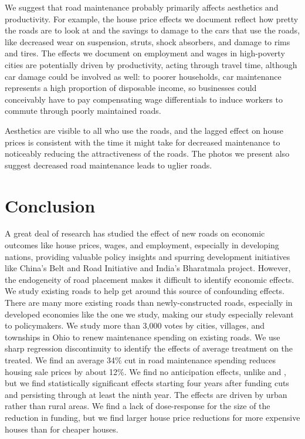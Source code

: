 We suggest that road maintenance probably primarily affects aesthetics and productivity.  For example, the house price effects we document reflect how pretty the roads are to look at and the savings to damage to the cars that use the roads, like decreased wear on suspension, struts, shock absorbers, and damage to rims and tires. The effects we document on employment and wages in high-poverty cities are potentially driven by productivity, acting through travel time, although car damage could be involved as well:  to poorer households, car maintenance represents a high proportion of disposable income, so businesses could conceivably have to pay compensating wage differentials to induce workers to commute through poorly maintained roads. 

 Aesthetics are visible to all who use the roads, and the lagged effect on house prices is consistent with the time it might take for decreased maintenance to noticeably reducing the attractiveness of the roads. The photos we present also suggest decreased road maintenance leads to uglier roads.


\section{Conclusion} \label{sec:conclusion}

A great deal of research has studied the effect of new roads on economic outcomes like house prices, wages, and employment, especially in developing nations, providing valuable policy insights and spurring development initiatives like China’s Belt and Road Initiative and India’s Bharatmala project.  However, the endogeneity of road placement makes it difficult to identify economic effects. We study existing roads to help get around this source of confounding effects. There are many more existing roads than newly-constructed roads, especially in developed economies like the one we study, making our study especially relevant to policymakers. We study more than 3,000 votes by cities, villages, and townships in Ohio to renew maintenance spending on existing roads. We use sharp regression discontinuity to identify the effects of average treatment on the treated.  We find an average 34\% cut in road maintenance spending reduces housing sale prices by about 12\%. We find no anticipation effects, unlike \cite{beenstock2016hedonic} and \cite{diao2017spatial}, but we find statistically significant effects starting four years after funding cuts and persisting through at least the ninth year.  The effects are driven by urban rather than rural areas. We find a lack of dose-response for the size of the reduction in funding, but we find larger house price reductions for more expensive houses than for cheaper houses.  

